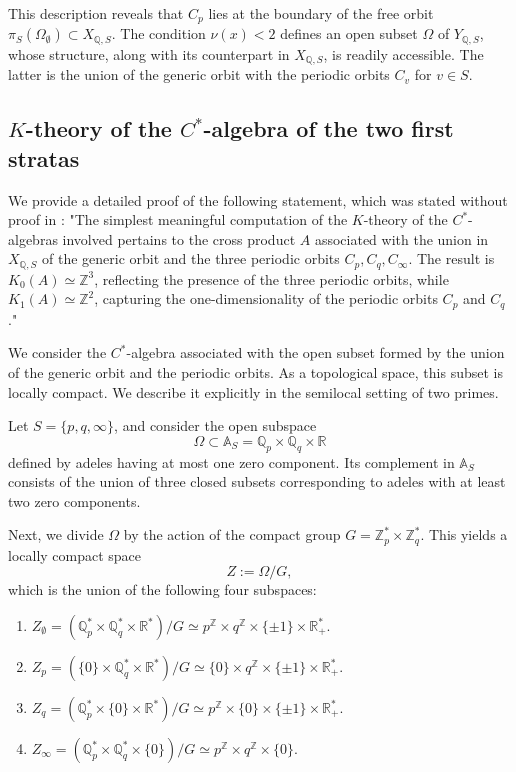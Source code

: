 \documentclass[letterpaper,11pt]{article}
\def\A{{\mathbb A}}
\def\Q{{\mathbb Q}}
\def\R{\mathbb{R}}
\def\Z{\mathbb{Z}}
\theoremstyle{plain}
\begin{document}
 This description reveals that $ C_p $ lies at the boundary of the free orbit $ \pi_S(\Omega_{\emptyset}) \subset X_{\Q,S} $. The condition $ \nu(x) < 2 $ defines an open subset $ \Omega $ of $ Y_{\Q,S} $, whose structure, along with its counterpart in $ X_{\Q,S} $, is readily accessible. The latter is the union of the generic orbit with the periodic orbits $ C_v $ for $ v \in S $.  



  \subsection{$K$-theory of the $ C^* $-algebra of the two first stratas}\label{KC*}
  We  provide a detailed proof of the following statement, which was stated without proof in \cite{CC8}:  \vspace{.02in}
"The simplest meaningful computation of the $ K $-theory of the $ C^* $-algebras involved pertains to the cross product $ A $ associated with the union in $ X_{\Q,S} $ of the generic orbit and the three periodic orbits $ C_p, C_q, C_\infty $. The result is $ K_0(A) \simeq \Z^3 $, reflecting the presence of the three periodic orbits, while $ K_1(A) \simeq \Z^2 $, capturing the one-dimensionality of the periodic orbits $ C_p $ and $ C_q $."\vspace{.02in} 

We consider the $ C^* $-algebra associated with the open subset formed by the union of the generic orbit and the periodic orbits. As a topological space, this subset is locally compact. We describe it explicitly in the semilocal setting of two primes.  

Let $ S = \{p, q, \infty\} $, and consider the open subspace  
\[
\Omega \subset \A_S = \Q_p \times \Q_q \times \R
\]  
defined by adeles having at most one zero component. Its complement in $ \A_S $ consists of the union of three closed subsets corresponding to adeles with at least two zero components.  

Next, we divide $ \Omega $ by the action of the compact group $ G = \Z_p^* \times \Z_q^* $. This yields a locally compact space  
\[
Z := \Omega / G,
\]  
which is the union of the following four subspaces:  





\begin{enumerate}
	\item $Z_\emptyset=\left(\Q_p^*\times \Q_q^*\times \R^*\right)/G\simeq p^\Z\times q^\Z\times \{\pm 1\}\times \R_+^*$.
	\item $Z_p=\left(\{0\}\times \Q_q^*\times \R^*\right)/G\simeq \{0\}\times q^\Z\times \{\pm 1\}\times \R_+^*$.
	\item $Z_q=\left(\Q_p^*\times \{0\}\times \R^*\right)/G\simeq p^\Z\times \{0\}\times \{\pm 1\}\times \R_+^*$.
	\item $Z_\infty=\left(\Q_p^*\times \Q_q^*\times \{0\}\right)/G\simeq p^\Z\times q^\Z\times \{0\}$.
\end{enumerate} 
\end{document}
